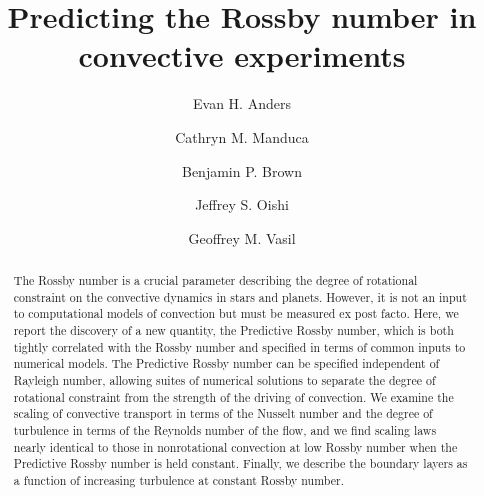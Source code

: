 \documentclass[twocolumn, amsmath, amsfonts, amssymb, trackchanges]{aastex62}
\begin{document}
\newcommand{\AB}{\citetalias{anders&brown2017}}

\title{Predicting the Rossby number in convective experiments}


\author[0000-0002-3433-4733]{Evan H. Anders}
\author{Cathryn M. Manduca}
\author[0000-0001-8935-219X]{Benjamin P. Brown}
\author[0000-0001-8531-6570]{Jeffrey S. Oishi}
\author{Geoffrey M. Vasil}


\begin{abstract}
  The Rossby number is a crucial parameter describing the degree of rotational constraint on the convective dynamics in stars and planets. 
However, it is not an input to computational models of convection but must be measured ex post facto. 
Here, we report the discovery of a new quantity, the Predictive Rossby number, which is both tightly correlated with the Rossby number and specified in terms of common inputs to numerical models. 
The Predictive Rossby number can be specified independent of Rayleigh number, allowing suites of numerical solutions to separate the degree of rotational constraint from the strength of the driving of convection.  
We examine the scaling of convective transport in terms of the Nusselt number and the degree of turbulence in terms of the Reynolds number of the flow, 
and we find scaling laws nearly identical to those in nonrotational convection at low
Rossby number when the Predictive Rossby number is held constant.
Finally, we describe the boundary layers as a function of increasing turbulence at constant Rossby number.
\end{abstract}


\end{document}
